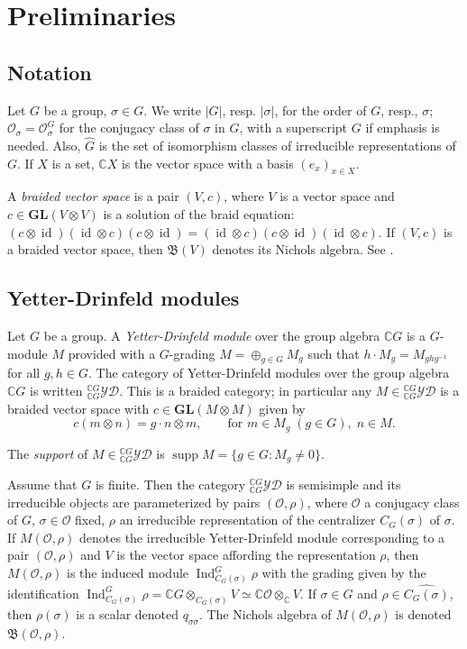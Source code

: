 \documentclass[11pt]{amsart} \textheight 22cm
\newcommand{\Ind}{\operatorname{Ind}}
\newcommand{\supp}{\operatorname{supp}}
\renewcommand{\^}[1]{\mbox{$^{\left( #1 \right)}$}}
\renewcommand{\_}[1]{\mbox{$_{\left( #1 \right)}$}}
\newcommand\toba{{\mathfrak B }}
\newcommand{\ku}{\mathbb C}
\newcommand{\G}{{\mathbb G}}
\newcommand{\gi}{{\G_{\infty}}}
\newcommand{\GL}{\mathbf{GL}}
\newcommand{\Oc}{{\mathcal O}}
\newcommand{\ydg}{{}^{\ku G}_{\ku G}\mathcal{YD}}
\theoremstyle{plain}
\theoremstyle{definition}
\theoremstyle{remark}
\newcommand\id{\operatorname{id}}
\theoremstyle{remark}
\begin{document}
\section{Preliminaries}\label{sect:prel}
\subsection{Notation}\label{subsect:not}
Let $G$ be a
group, $\sigma\in G$. We write $\vert G\vert$, resp. $\vert
\sigma\vert$, for the order of $G$, resp., $\sigma$;
$\mathcal{O}_{\sigma}=\mathcal{O}_{\sigma}^{G}$ for the conjugacy
class of $\sigma$ in $G$, with a superscript $G$ if emphasis is
needed. Also, $\widehat{G}$ is the set of isomorphism classes of
irreducible representations of $G$. If $X$ is a set, $\ku X$ is
the vector space with a basis $(e_x)_{x\in X}$.

A \emph{braided vector space} is a pair $(V,c)$, where $V$ is a
vector space and $c\in \GL(V\otimes V)$ is a solution of the braid
equation: $(c\otimes \id) (\id\otimes c) (c\otimes \id) =
(\id\otimes c) (c\otimes \id) (\id\otimes c)$. If $(V,c)$ is a
braided vector space, then $\toba(V)$ denotes its Nichols algebra.
See \cite[p. 22]{AS-cambr}.

\medbreak\subsection{Yetter-Drinfeld modules}\label{subsect:yd}
Let $G$ be a group. A \emph{Yetter-Drinfeld module} over the group
algebra $\ku G$ is a $G$-module $M$ provided with a $G$-grading $M
= \oplus_{g\in G} M_g$ such that $h\cdot M_g = M_{ghg^{-1}}$ for
all $g,h\in G$. The category of Yetter-Drinfeld modules over the
group algebra $\ku G$ is written $\ydg$. This is a braided
category; in particular any $M\in \ydg$ is a braided vector space
with $c\in \GL(M\otimes M)$ given by
\begin{equation}\label{eqn:brqiding-ydg}
    c(m\otimes n) = g\cdot n \otimes m, \qquad \text{for }m\in M_g\;(g\in G),\;n\in M.
\end{equation}

\medbreak The \emph{support} of $M\in \ydg$ is $\supp M = \{g\in
G: M_g \neq 0\}$.

Assume that $G$ is finite. Then the category $\ydg$ is semisimple
and its irreducible objects are parameterized by pairs $(\Oc,
\rho)$, where $\Oc$ a conjugacy class of $G$, $\sigma\in \Oc$
fixed, $\rho$ an irreducible representation of the centralizer
$C_{G}(\sigma)$ of $\sigma$.  If $M(\Oc, \rho)$ denotes the
irreducible Yetter-Drinfeld module corresponding to a pair $(\Oc,
\rho)$ and $V$ is the vector space affording the representation
$\rho$, then $M(\Oc, \rho)$ is the induced module
$\Ind_{C_{G}(\sigma)}^G\rho$ with the grading given by the
identification $\Ind_{C_{G}(\sigma)}^G \rho = \ku
G\otimes_{C_{G}(\sigma)} V \simeq \ku \Oc \otimes_\ku V$. If
$\sigma\in G$ and $\rho\in \widehat{C_{G}(\sigma)}$, then
$\rho(\sigma)$ is a scalar denoted $q_{\sigma\sigma}$. The Nichols
algebra of $M(\Oc, \rho)$ is denoted $\toba(\Oc, \rho)$.
\end{document}
